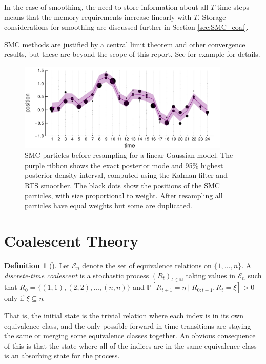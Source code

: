 \documentclass[fleqn]{article}
\theoremstyle{definition}
\newtheorem{defn}{Definition}
\newcommand{\PR}{\mathbb{P}}
\begin{document}
In the case of smoothing, the need to store information about all $T$ time steps means that the memory requirements increase linearly with $T$.
Storage considerations for smoothing are discussed further in Section \ref{sec:SMC_coal}.

SMC methods are justified by a central limit theorem and other convergence results, but these are beyond the scope of this report. See for example \citet{delmoral2013} for details.

\begin{figure}
\centering
\includegraphics[width=0.9\textwidth]{smc_kalman.pdf}
\caption{SMC particles before resampling for a linear Gaussian model. The purple ribbon shows the exact posterior mode and 95\% highest posterior density interval, computed using the Kalman filter and RTS smoother. The black dots show the positions of the SMC particles, with size proportional to weight. After resampling all particles have equal weights but some are duplicated.}
\label{fig:SMC_vs_kalman}
\end{figure}

\section{Coalescent Theory}\label{sec:coalescent_theory}
\begin{defn}[\citet{mohle1998}]
Let $\mathcal{E}_n$ denote the set of equivalence relations on $\{1,\dots,n\}$.
A \emph{discrete-time coalescent} is a stochastic process $(R_t)_{t\in\mathbb{N}}$ taking values in $\mathcal{E}_n$ such that 
$R_0 = \{(1,1),(2,2),\dots,(n,n)\}$ and $\PR[R_{t+1} = \eta \mid R_{0:t-1}, R_{t} = \xi] > 0$ only if $\xi \subseteq \eta$.
\end{defn}
That is, the initial state is the trivial relation where each index is in its own equivalence class, and the only possible forward-in-time transitions are staying the same or merging some equivalence classes together.
An obvious consequence of this is that the state where all of the indices are in the same equivalence class is an absorbing state for the process.
\end{document}
